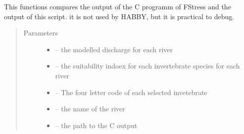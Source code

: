 \documentclass[letterpaper,10pt,english]{sphinxmanual}
\begin{document}
\begin{fulllineitems}
\label{\detokenize{index:src.fstress.fstress_test}}
This functions compares the output of the C programm of FStress and the output of this script. it is not used
by HABBY, but it is practical to debug.
\begin{quote}\begin{description}
\item[{Parameters}] \leavevmode\begin{itemize}
\item {} 
 -- the modelled discharge for each river

\item {} 
 -- the suitability indoex for each invertebrate species for each river

\item {} 
 -- The four letter code of each selected invetebrate

\item {} 
 -- the name of the river

\item {} 
 -- the path to the C output

\end{itemize}

\end{description}\end{quote}

\end{fulllineitems}

\end{document}
